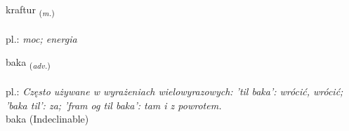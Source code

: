 \documentclass[frontgrid, backgrid]{flacards}\usepackage[]{graphicx}\usepackage[]{xcolor}
\begin{document}
\renewcommand{\flhead}{\vskip5pt \fboxsep=0pt {\small\bfseries\footnotesize Nafnorð | rzeczownik}}
\renewcommand{\fcfoot}{\vskip5pt \fboxsep=0pt \hspace{2pt}{\small\bfseries\footnotesize 1K}}

\renewcommand{\blhead}{\vskip5pt {\small\bfseries\footnotesize Nafnorð | rzeczownik }}
\renewcommand{\bcfoot}{\vskip5pt \hspace{2pt}{\small\bfseries\footnotesize 1K}}


{kraftur \small{\textsubscript{(\textit{m.})}} \\[1ex] %
\textphonetic{[kʰraftʏr]} \\
pl.: \emph{moc; energia} \\  [2ex]
\renewcommand*{\arraystretch}{0.8}
}


\renewcommand{\flhead}{\vskip5pt \fboxsep=0pt {\small\bfseries\footnotesize Atviksorð | przysłówek}}
\renewcommand{\fcfoot}{\vskip5pt \fboxsep=0pt \hspace{2pt}{\small\bfseries\footnotesize 1K}}

\renewcommand{\blhead}{\vskip5pt {\small\bfseries\footnotesize Atviksorð | przysłówek }}
\renewcommand{\bcfoot}{\vskip5pt \hspace{2pt}{\small\bfseries\footnotesize 1K}}


{baka \small{\textsubscript{(\textit{adv.})}} \\[1ex]
\textphonetic{[paːka]} \\
pl.: \emph{Często używane w wyrażeniach wielowyrazowych: 'til baka': wrócić, wrócić; 'baka til': za; 'fram og til baka': tam i z powrotem.} \\  [2ex]
baka (Indeclinable)}
\end{document}
